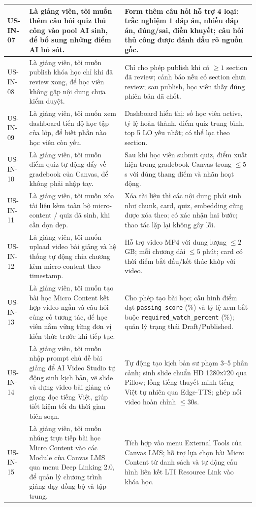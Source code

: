 \begin{longtable}{|p{1.6cm}|p{5.6cm}|p{7cm}|}
\hline
US-IN-07 & Là giảng viên, tôi muốn thêm câu hỏi quiz thủ công vào pool AI sinh, để bổ sung những điểm AI bỏ sót. & Form thêm câu hỏi hỗ trợ 4 loại: trắc nghiệm 1 đáp án, nhiều đáp án, đúng/sai, điền khuyết; câu hỏi thủ công được đánh dấu rõ nguồn gốc. \\
\hline
US-IN-08 & Là giảng viên, tôi muốn publish khóa học chỉ khi đã review xong, để học viên không gặp nội dung chưa kiểm duyệt. & Chỉ cho phép publish khi có \(\geq 1\) section đã review; cảnh báo nếu có section chưa review; sau publish, học viên thấy đúng phiên bản đã chốt. \\
\hline
US-IN-09 & Là giảng viên, tôi muốn xem dashboard tiến độ học tập của lớp, để biết phần nào học viên còn yếu. & Dashboard hiển thị: số học viên active, tỷ lệ hoàn thành, điểm quiz trung bình, top 5 LO yếu nhất; có thể lọc theo section. \\
\hline
US-IN-10 & Là giảng viên, tôi muốn điểm quiz tự động đẩy về gradebook của Canvas, để không phải nhập tay. & Sau khi học viên submit quiz, điểm xuất hiện trong gradebook Canvas trong \(\leq 5\) s với đúng thang điểm và nhãn hoạt động. \\
\hline
US-IN-11 & Là giảng viên, tôi muốn xóa tài liệu kèm toàn bộ micro-content / quiz đã sinh, khi cần dọn dẹp. & Xóa tài liệu thì các nội dung phái sinh như chunk, card, quiz, embedding cũng được xóa theo; có xác nhận hai bước; thao tác lặp lại không gây lỗi. \\
\hline
US-IN-12 & Là giảng viên, tôi muốn upload video bài giảng và hệ thống tự động chia chương kèm micro-content theo timestamp. & Hỗ trợ video MP4 với dung lượng \(\leq 2\) GB; mỗi chương dài \(\leq 5\) phút; card có thời điểm bắt đầu/kết thúc khớp với video. \\
\hline
US-IN-13 & Là giảng viên, tôi muốn tạo bài học Micro Content kết hợp video ngắn và câu hỏi củng cố tương tác, để học viên nắm vững từng đơn vị kiến thức trước khi tiếp tục. & Cho phép tạo bài học; cấu hình điểm đạt \texttt{passing\_score} (\%) và tỷ lệ xem bắt buộc \texttt{required\_watch\_percent} (\%); quản lý trạng thái Draft/Published. \\
\hline
US-IN-14 & Là giảng viên, tôi muốn nhập prompt chủ đề bài giảng để AI Video Studio tự động sinh kịch bản, vẽ slide và dựng video bài giảng có giọng đọc tiếng Việt, giúp tiết kiệm tối đa thời gian biên soạn. & Tự động tạo kịch bản sư phạm 3--5 phân cảnh; sinh slide chuẩn HD 1280x720 qua Pillow; lồng tiếng thuyết minh tiếng Việt tự nhiên qua Edge-TTS; ghép nối video hoàn chỉnh $\leq 30$s. \\
\hline
US-IN-15 & Là giảng viên, tôi muốn nhúng trực tiếp bài học Micro Content vào các Module của Canvas LMS qua menu Deep Linking 2.0, để quản lý chương trình giảng dạy đồng bộ và tập trung. & Tích hợp vào menu External Tools của Canvas LMS; hỗ trợ lựa chọn bài Micro Content từ danh sách và tự động cấu hình liên kết LTI Resource Link vào khóa học. \\
\hline
\end{longtable}
\endgroup

